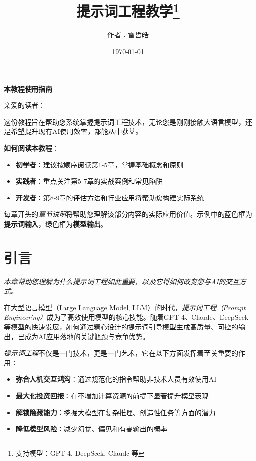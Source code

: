 \documentclass[12pt]{ctexart}
\title{提示词工程教学\thanks{支持模型：GPT-4, DeepSeek, Claude 等}}
\author{作者：\href{ray12303@163.com}{雷哲皓}}
\date{\today}
\newcommand{\chapternote}[1]{\vspace{-0.3cm}\par\noindent\textit{\small #1}\vspace{0.3cm}}
\begin{document}
\maketitle

\begin{center}
\large\textbf{本教程使用指南}
\end{center}

\noindent 亲爱的读者：

这份教程旨在帮助您系统掌握提示词工程技术，无论您是刚刚接触大语言模型，还是希望提升现有AI使用效率，都能从中获益。

\textbf{如何阅读本教程}：
\begin{itemize}
  \item \textbf{初学者}：建议按顺序阅读第1-5章，掌握基础概念和原则
  \item \textbf{实践者}：重点关注第5-7章的实战案例和常见陷阱
  \item \textbf{开发者}：第8-9章的评估方法和行业应用将帮助您构建实际系统
\end{itemize}

每章开头的\textit{章节说明}将帮助您理解该部分内容的实际应用价值。示例中的蓝色框为\textbf{提示词输入}，绿色框为\textbf{模型输出}。

\tableofcontents
\newpage

\section{引言}
\chapternote{本章帮助您理解为什么提示词工程如此重要，以及它将如何改变您与AI的交互方式。}

在大型语言模型（Large Language Model, LLM）的时代，\emph{提示词工程（Prompt Engineering）}成为了高效使用模型的核心技能。随着GPT-4、Claude、DeepSeek等模型的快速发展，如何通过精心设计的提示词引导模型生成高质量、可控的输出，已成为AI应用落地的关键瓶颈与竞争优势。

\emph{提示词工程}不仅是一门技术，更是一门艺术，它在以下方面发挥着至关重要的作用：
\begin{itemize}
  \item \textbf{弥合人机交互鸿沟}：通过规范化的指令帮助非技术人员有效使用AI
  \item \textbf{最大化投资回报}：在不增加计算资源的前提下显著提升模型表现
  \item \textbf{解锁隐藏能力}：挖掘大模型在复杂推理、创造性任务等方面的潜力
  \item \textbf{降低模型风险}：减少幻觉、偏见和有害输出的概率
\end{itemize}
\end{document}
